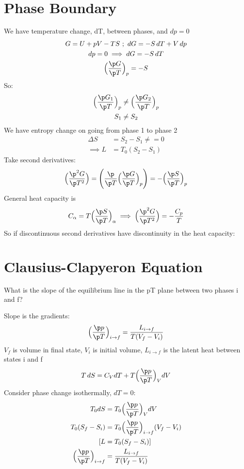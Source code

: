\documentclass[a4paper, 11pt, normalem]{report}
\begin{document}
\section{Phase Boundary}
We have temperature change, dT, between phases, and $dp = 0$
\begin{gather*}
    G = U + pV - TS ~;~ dG = -S\,dT + V\,dp \\
    dp = 0 \implies dG = -S\,dT \\
    \Big(\frac{\p G}{\p T}\Big)_p = -S
\end{gather*}
So:
\begin{align*}
    \Big(\frac{\p G_1}{\p T}\Big)_p &\neq \Big(\frac{\p G_2}{\p T}\Big)_p \\
    S_1 &\neq S_2
\end{align*}
We have entropy change on going from phase 1 to phase 2
\begin{align*}
    \Delta S &= S_2 - S_1 \neq = 0 \\
    \implies L &= T_0 (S_2 - S_1)
\end{align*}
Take second derivatives:
\begin{equation*}
    \Big(\frac{\p^2 G}{\p T^2}\Big) = \Bigg(\frac{\p}{\p T}\Big(\frac{\p G}{\p T}\Big)_p\Bigg) = -\Big(\frac{\p S}{\p T}\Big)_p
\end{equation*}
General heat capacity is
\begin{equation*}
    C_\alpha = T\Big(\frac{\p S}{\p T}\Big)_\alpha \implies \Big(\frac{\p^2 G}{\p T^2}\Big) = -\frac{C_p}{T}
\end{equation*}
So if discontinuous second derivatives have discontinuity in the heat capacity:

\section{Clausius-Clapyeron Equation}
What is the slope of the equilibrium line in the pT plane between two phases i and f?

Slope is the gradients:
\begin{equation*}
    \Big(\frac{\p p}{\p T}\Big)_{i \to f} = \frac{L_{i \to f}}{T(V_f - V_i)}
\end{equation*}
$V_f$ is volume in final state, $V_i$ is initial volume, $L_{i \to f}$ is the latent heat between states i and f
\begin{equation*}
    T\,dS = C_V dT + T\Big(\frac{\p p}{\p T}\Big)_V dV
\end{equation*}
Consider phase change isothermally, $dT = 0$:
\begin{align*}
    T_0 dS &= T_0 \Big(\frac{\p p}{\p T}\Big)_V dV \\
    T_0 (S_f - S_i) &= T_0 \Big(\frac{\p p}{\p T}\Big)_{i \to f} (V_f - V_i) \\
    [L &= T_0 (S_f - S_i)] \\
    \Big(\frac{\p p}{\p T}\Big)_{i \to f} &= \frac{L_{i \to f}}{T(V_f - V_i)}
\end{align*}
\end{document}
